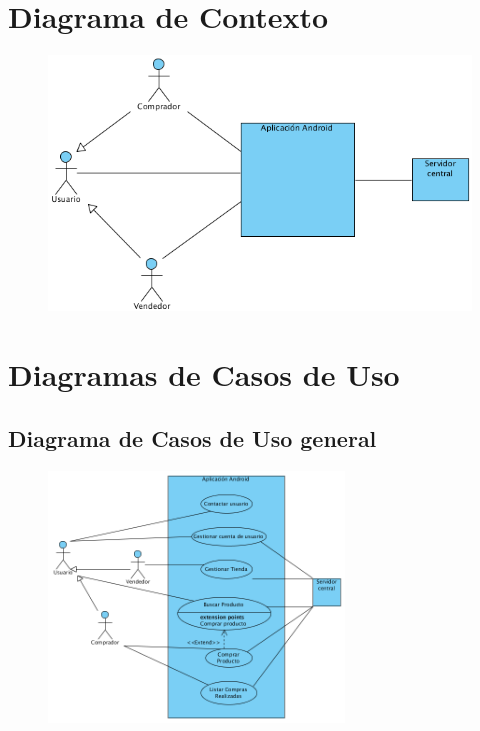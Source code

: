 \section{Diagrama de Contexto}

\begin{figure}[H]
  \centering
   
    \includegraphics[width=1\textwidth]{imagenes/analisis/diagrama-contexto.png}
	\label{fig:casos-de-uso}
\end{figure}

\section{Diagramas de Casos de Uso}

\subsection{Diagrama de Casos de Uso general}

\begin{figure}[H]
  \centering
    \includegraphics[width=0.7\textwidth]{imagenes/analisis/casos-uso-general.png}
	\label{fig:casos-de-uso}
\end{figure}

